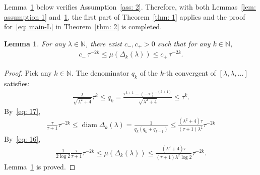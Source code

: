 \documentclass[12pt,reqno]{amsart}
\theoremstyle{definition}
\theoremstyle{plain}
\newtheorem{lemma}{Lemma}
\begin{document}
Lemma~\ref{lem: assumption 2} below verifies Assumption~\ref{ass: 2}. Therefore, with both Lemmas~\ref{lem: assumption 1} and~\ref{lem: assumption 2}, the first part of Theorem~\ref{thm: 1} applies and the proof for~\eqref{eq: main-L} in Theorem~\ref{thm: 2} is completed.
\begin{lemma}\label{lem: assumption 2}
For any $\lambda\in\mathbb{N}$, there exist $c_-,c_+>0$ such that for any $k\in\mathbb{N}$,
\begin{align*}
    c_-\,\tau^{-2k}\leq \mu{(\Delta_k{(\lambda)})}\leq c_+\,\tau^{-2k}.
\end{align*}
\end{lemma}
\begin{proof}
Pick any $k\in\mathbb{N}$. The denominator $q_k$ of the $k$-th convergent of $[\lambda,\lambda,\ldots]$ satisfies:
\begin{align*}
    \frac{\lambda}{\sqrt{\lambda^2+4}}\tau^{k}\leq q_{k}=\frac{\tau^{k+1}-(-\tau)^{-(k+1)}}{\sqrt{\lambda^2+4}}\leq \tau^{k}.
\end{align*}
By~\eqref{eq: 17},
\begin{align*}
    \frac{\tau}{\tau+1} \tau^{-2k}
    \leq \operatorname{diam}{\Delta_k{(\lambda)}}
    =\frac{1}{q_k(q_k+q_{k-1})}
    \leq\frac{(\lambda^2+4)\tau}{(\tau+1)\lambda^2}\tau^{-2k}
\end{align*}
By~\eqref{eq: 16},
\begin{align*}
     \frac{1}{2\log{2}}\frac{\tau}{\tau+1}\tau^{-2k}\leq \mu{(\Delta_k{(\lambda)})}\leq \frac{(\lambda^2+4)\tau}{(\tau+1)\lambda^2\log{2}}\tau^{-2k}.
\end{align*}
Lemma~\ref{lem: assumption 2} is proved.
\end{proof}
\end{document}
